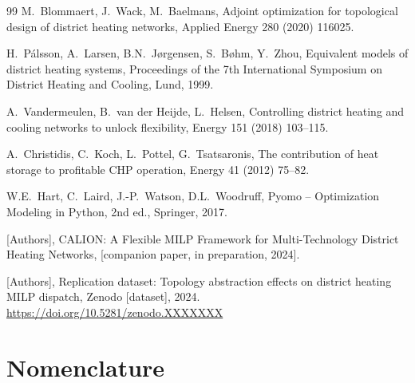 \documentclass[review,3p]{elsarticle}
\begin{document}
\begin{thebibliography}{99}
M.\ Blommaert, J.\ Wack, M.\ Baelmans,
Adjoint optimization for topological design of district heating
networks,
Applied Energy 280 (2020) 116025.

H.\ Pálsson, A.\ Larsen, B.N.\ Jørgensen, S.\ Bøhm, Y.\ Zhou,
Equivalent models of district heating systems,
Proceedings of the 7th International Symposium on District Heating
and Cooling, Lund, 1999.

A.\ Vandermeulen, B.\ van der Heijde, L.\ Helsen,
Controlling district heating and cooling networks to unlock
flexibility,
Energy 151 (2018) 103--115.

A.\ Christidis, C.\ Koch, L.\ Pottel, G.\ Tsatsaronis,
The contribution of heat storage to profitable CHP operation,
Energy 41 (2012) 75--82.

W.E.\ Hart, C.\ Laird, J.-P.\ Watson, D.L.\ Woodruff,
Pyomo -- Optimization Modeling in Python, 2nd ed., Springer, 2017.

[Authors], CALION: A Flexible MILP Framework for Multi-Technology
District Heating Networks, [companion paper, in preparation, 2024].

[Authors], Replication dataset: Topology abstraction effects on
district heating MILP dispatch, Zenodo [dataset], 2024.
\url{https://doi.org/10.5281/zenodo.XXXXXXX}

\end{thebibliography}

\appendix

\section{Nomenclature}
\label{app:nomenclature}
\end{document}
